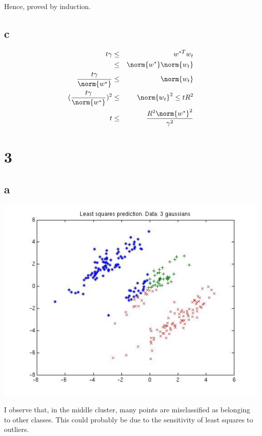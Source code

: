 \documentclass{article}
\begin{document}
Hence, proved by induction.

\subsection{c}
\begin{eqnarray*}
t\gamma &\leq& w^{*T}w_{t}\\
&\leq& \norm{w^{*}}\norm{w_{t}}\\
\frac{t\gamma}{\norm{w^{*}}} &\leq& \norm{w_{t}}\\
(\frac{t\gamma}{\norm{w^{*}}})^{2} &\leq& \norm{w_{t}}^{2} \leq tR^{2}\\
t &\leq& \frac{R^{2}\norm{w^{*}}^{2}}{\gamma^{2}}\\
\end{eqnarray*}


\section{3}
\subsection{a}
\includegraphics[scale=.75]{lsqPrediction.jpg}

I observe that, in the middle cluster, many points are misclassified as belonging to other classes. This could probably be due to the sensitivity of least squares to outliers.
\end{document}
